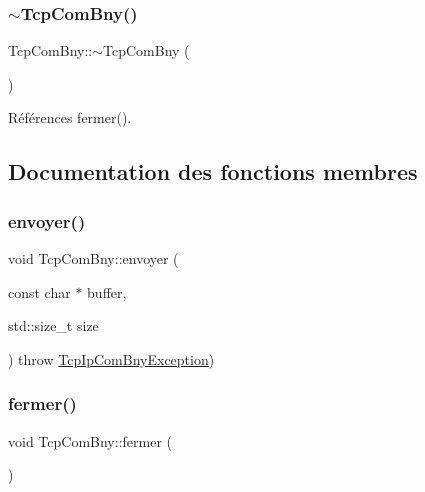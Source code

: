\mbox{\label{classTcpComBny_ab4aec67058de5219876f7093c9f84353}} 
\subsubsection{\texorpdfstring{$\sim$\+Tcp\+Com\+Bny()}{~TcpComBny()}}
{\footnotesize\ttfamily Tcp\+Com\+Bny\+::$\sim$\+Tcp\+Com\+Bny (\begin{DoxyParamCaption}{ }\end{DoxyParamCaption})}



Références fermer().



\subsection{Documentation des fonctions membres}
\mbox{\label{classTcpComBny_abe45becb6b9d1605e2d9433bd784024a}} 
\subsubsection{\texorpdfstring{envoyer()}{envoyer()}}
{\footnotesize\ttfamily void Tcp\+Com\+Bny\+::envoyer (\begin{DoxyParamCaption}\item[{const char $\ast$}]{buffer,  }\item[{std\+::size\+\_\+t}]{size }\end{DoxyParamCaption}) throw  \hyperlink{classTcpIpComBnyException}{Tcp\+Ip\+Com\+Bny\+Exception}) }

\mbox{\label{classTcpComBny_a5c12a58e106149b561fd5438d1a953d2}} 
\subsubsection{\texorpdfstring{fermer()}{fermer()}}
{\footnotesize\ttfamily void Tcp\+Com\+Bny\+::fermer (\begin{DoxyParamCaption}{ }\end{DoxyParamCaption})}

